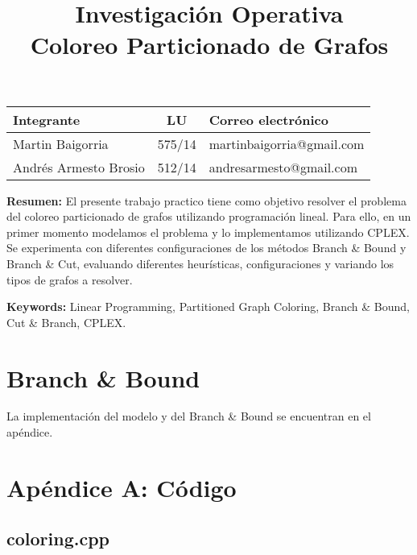 \documentclass[10pt,a4paper]{article}
\title{Investigación Operativa \\ Coloreo Particionado de Grafos}
\begin{document}

\maketitle

\bigskip

\begin{table}[h]
\centering
\begin{tabular}{|l l l|}
\hline
Integrante       & \multicolumn{1}{c}{LU}     & Correo electrónico        \\ \hline
Martin Baigorria & \multicolumn{1}{c}{575/14} & martinbaigorria@gmail.com \\ 
Andrés Armesto Brosio & 512/14 & andresarmesto@gmail.com \\  \hline
\end{tabular}
\end{table}

\vfill
\textbf{Resumen:} El presente trabajo practico tiene como objetivo resolver el problema del coloreo particionado de grafos utilizando programación lineal. Para ello, en un primer momento modelamos el problema y lo implementamos utilizando CPLEX. Se experimenta con diferentes configuraciones de los métodos Branch \& Bound y Branch \& Cut, evaluando diferentes heurísticas, configuraciones y variando los tipos de grafos a resolver.

\textbf{Keywords:} Linear Programming, Partitioned Graph Coloring, Branch \& Bound, Cut \& Branch, CPLEX.

\newpage
\tableofcontents
\newpage



\newpage
\section{Branch \& Bound}
La implementación del modelo y del Branch \& Bound se encuentran en el apéndice.

\newpage

\newpage


\vfill



\pagebreak

\section{Apéndice A: Código}
\subsection{coloring.cpp}

\end{document}
